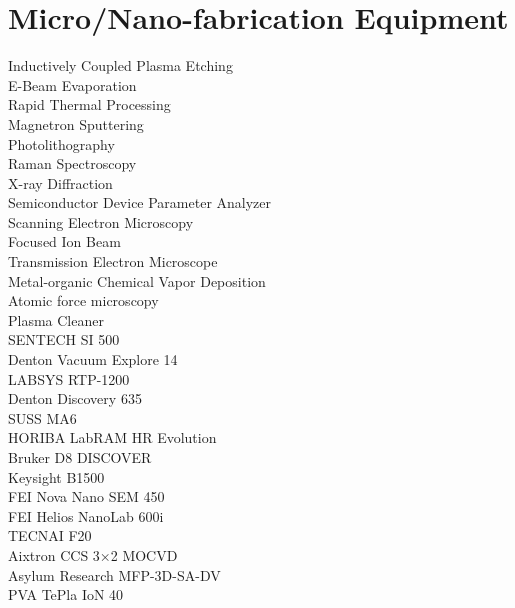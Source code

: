 \chapter{Micro/Nano-fabrication Equipment} 

\begin{multicols}{2}
\noindent Inductively Coupled Plasma Etching	\\
E-Beam Evaporation\\
Rapid Thermal Processing\\
Magnetron Sputtering\\
Photolithography\\
Raman Spectroscopy\\
X-ray Diffraction\\
Semiconductor Device Parameter Analyzer \\
Scanning Electron Microscopy\\
Focused Ion Beam \\
Transmission Electron Microscope \\
Metal-organic Chemical Vapor Deposition\\
Atomic force microscopy \\
Plasma Cleaner\\
SENTECH SI 500\\
Denton Vacuum Explore 14\\
LABSYS RTP-1200\\
Denton Discovery 635\\
SUSS MA6\\
HORIBA  LabRAM HR Evolution\\
Bruker D8 DISCOVER \\
Keysight B1500\\
FEI Nova Nano SEM 450\\
FEI Helios NanoLab 600i\\ 
TECNAI F20\\
Aixtron CCS 3×2 MOCVD\\
Asylum Research MFP-3D-SA-DV \\
PVA TePla IoN 40 
\end{multicols}

